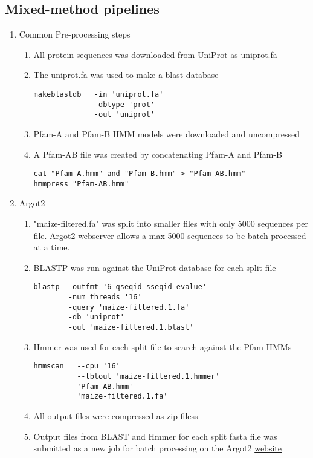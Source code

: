 \documentclass[11pt,letterpaper]{article}
\begin{document}
  \subsection{Mixed-method pipelines}
  \begin{enumerate}
    \item Common Pre-processing steps
    \begin{enumerate}
      \item All protein sequences was downloaded from UniProt as uniprot.fa
      \item The uniprot.fa was used to make a blast database
      \begin{verbatim}
makeblastdb   -in 'uniprot.fa'
              -dbtype 'prot'
              -out 'uniprot'
      \end{verbatim}
      \item Pfam-A and Pfam-B HMM models were downloaded and uncompressed
      \item A Pfam-AB file was created by concatenating Pfam-A and Pfam-B
      \begin{verbatim}
cat "Pfam-A.hmm" and "Pfam-B.hmm" > "Pfam-AB.hmm"
hmmpress "Pfam-AB.hmm"
      \end{verbatim}
    \end{enumerate}
    \item Argot2
    \begin{enumerate}
      \item "maize-filtered.fa" was split into smaller files with only 5000 sequences per file. Argot2 webserver allows a max 5000 sequences to be batch processed at a time.
      \item BLASTP was run against the UniProt database for each split file
       \begin{verbatim}
blastp  -outfmt '6 qseqid sseqid evalue'
        -num_threads '16'
        -query 'maize-filtered.1.fa'
        -db 'uniprot'
        -out 'maize-filtered.1.blast'
       \end{verbatim}
       \item Hmmer was used for each split file to search against the Pfam HMMs
       \begin{verbatim}
hmmscan   --cpu '16'
          --tblout 'maize-filtered.1.hmmer'
          'Pfam-AB.hmm'
          'maize-filtered.1.fa'
       \end{verbatim}
       \item All output files were compressed as zip filess
       \item Output files from BLAST and Hmmer for each split fasta file was submitted as a new job for batch processing on the Argot2  \href{http://www.medcomp.medicina.unipd.it/Argot2/form_batch.php }{website}

\end{enumerate}
\end{enumerate}
\end{document}

